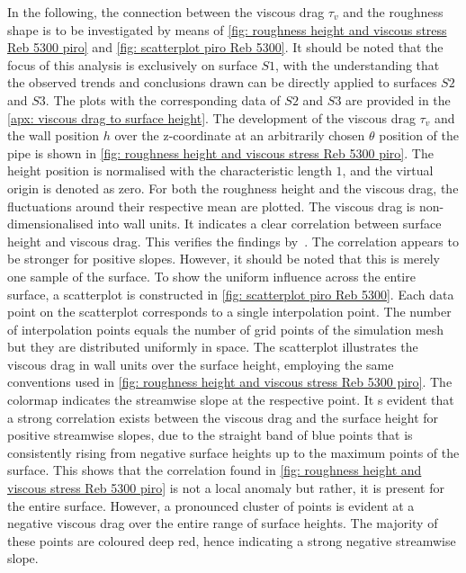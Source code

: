 In the following, the connection between the viscous drag $\tau_v$ and the roughness shape is to be investigated by means of  \autoref{fig: roughness height and viscous stress Reb 5300 piro} and \autoref{fig: scatterplot piro Reb 5300}. 
It should be noted that the focus of this analysis is exclusively on   surface $S1$,
with the understanding that the observed trends and conclusions drawn can be directly applied to   surfaces $S2$ and $S3$.
The plots with the corresponding data of $S2$ and $S3$ are  provided in the \autoref{apx: viscous drag to surface height}.
The development of the viscous drag $\tau_v$ and the wall position $h$ over the z-coordinate at an arbitrarily chosen $\theta$ position of the pipe is shown in \autoref{fig: roughness height and viscous stress Reb 5300 piro}.
The height position is normalised with the characteristic length $1$, and the virtual origin is denoted as zero.
For both the roughness height and the viscous drag, the fluctuations around their respective mean are plotted.
The viscous drag is non-dimensionalised into wall units.
It indicates a clear correlation between surface height and viscous drag.
This verifies the findings by~\cite{maDirectNumericalSimulation2021}.
The correlation appears to be stronger for positive slopes.
However, it should be noted that this is merely one sample of the surface.
To show the uniform influence across the entire surface,  a scatterplot is constructed in \autoref{fig: scatterplot piro Reb 5300}.
Each data point on the scatterplot corresponds to a single  interpolation point.
The number of interpolation points equals the number of grid points of the simulation mesh but they are  distributed  uniformly in space.
The scatterplot illustrates  the viscous drag in wall units over the surface height, employing the same conventions used in \autoref{fig: roughness height and viscous stress Reb 5300 piro}.
The colormap indicates the streamwise slope at the respective point.
It s evident  that a strong correlation exists between the viscous drag and the surface height for positive streamwise slopes, due to the straight band of blue points that is consistently rising from negative surface heights up to the maximum points of the surface.
This shows that the correlation found in \autoref{fig: roughness height and viscous stress Reb 5300 piro} is not a local anomaly but rather, it is present for the entire surface.
However, a pronounced cluster of points is evident  at a negative viscous drag over the entire range of surface heights.
The majority of these points are coloured deep red, hence indicating a strong negative streamwise slope.
